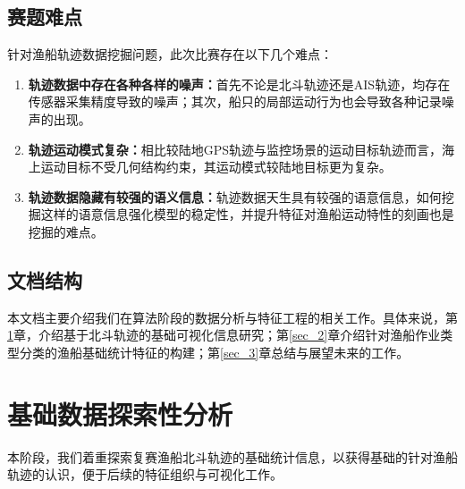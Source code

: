 \documentclass[UTF8, 12pt]{ctexart}
\begin{document}
		\subsection{赛题难点}
		针对渔船轨迹数据挖掘问题，此次比赛存在以下几个难点：
		\begin{enumerate}
			\item \textbf{轨迹数据中存在各种各样的噪声：}首先不论是北斗轨迹还是AIS轨迹，均存在传感器采集精度导致的噪声；其次，船只的局部运动行为也会导致各种记录噪声的出现。
			\item \textbf{轨迹运动模式复杂：}相比较陆地GPS轨迹与监控场景的运动目标轨迹而言，海上运动目标不受几何结构约束，其运动模式较陆地目标更为复杂。
			\item \textbf{轨迹数据隐藏有较强的语义信息：}轨迹数据天生具有较强的语意信息，如何挖掘这样的语意信息强化模型的稳定性，并提升特征对渔船运动特性的刻画也是挖掘的难点。
		\end{enumerate}

		\subsection{文档结构}
		本文档主要介绍我们在算法阶段的数据分析与特征工程的相关工作。具体来说，第\ref{sec_1}章，介绍基于北斗轨迹的基础可视化信息研究；第\ref{sec_2}章介绍针对渔船作业类型分类的渔船基础统计特征的构建；第\ref{sec_3}章总结与展望未来的工作。

	\section{基础数据探索性分析}\label{sec_1}
	本阶段，我们着重探索复赛渔船北斗轨迹的基础统计信息，以获得基础的针对渔船轨迹的认识，便于后续的特征组织与可视化工作。

\end{document}
